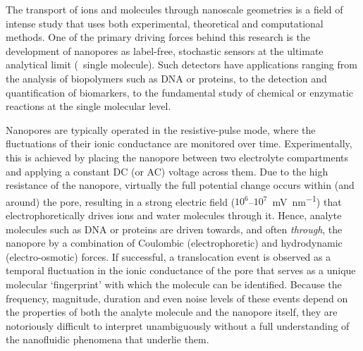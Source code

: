 \documentclass[journal=ancac3,manuscript=article,etalmode=truncate,maxauthors=0,layout=onecolumn]{achemso}
\begin{document}
The transport of ions and molecules through nanoscale geometries is a field of intense study that uses both
experimental, theoretical and computational methods.\cite{Sparreboom-2010,Bocquet-2010,Maffeo-2012,
Thomas-2014,Wang-2014,Kim-2015} One of the primary driving forces behind this research is the development of
nanopores as label-free, stochastic sensors at the ultimate analytical limit (\ie{}~single molecule).
\cite{Bayley-2001,Dekker-2007,Venkatesan-2011,Zhang-2016} Such detectors have applications ranging from the
analysis of biopolymers such as
DNA\cite{Deamer-2016,Kasianowicz-1996,Meller-2000,Maglia-2008,Butler-2008,Stoddart-2009,Franceschini-2013,Jain-2018}
or proteins,\cite{Restrepo-Perez-2018,Talaga-2009,Rodriguez-Larrea-2013, Nivala-2013,Kennedy-2016} to the
detection and quantification of
biomarkers,\cite{Chen-2013,Soskine-2012,Niedzwiecki-2013,VanMeervelt-2014,Huang-2017,Liu-2018,Galenkamp-2018}
to the fundamental study of chemical or enzymatic reactions at the single molecular
level.\cite{Willems-VanMeervelt-2017,Lieberman-2010, Nivala-2013,Ho-2015,Laszlo-2017}

Nanopores are typically operated in the resistive-pulse mode, where the fluctuations of their ionic
conductance are monitored over time.\cite{Bayley-2001,Dekker-2007,Maglia-2010,Venkatesan-2011} Experimentally,
this is achieved by placing the nanopore between two electrolyte compartments and applying a constant DC (or
AC) voltage across them. Due to the high resistance of the nanopore, virtually the full potential change
occurs within (and around) the pore, resulting in a strong electric field ($10^6$--$10^7$~\si{\mV\per\nm})
that electrophoretically drives ions and water molecules through
it.\cite{Wong-2007,Mao-2014,Haywood-2014,Laohakunakorn-2015} Hence, analyte molecules such as DNA or proteins
are driven towards, and often \emph{through}, the nanopore by a combination of Coulombic (electrophoretic) and
hydrodynamic (electro-osmotic) forces.\cite{Wong-2007,Grosberg-2010,Muthukumar-2010, Muthukumar-2014} If
successful, a translocation event is observed as a temporal fluctuation in the ionic conductance of the pore
that serves as a unique molecular `fingerprint' with which the molecule can be identified.\cite{Yusko-2017}
Because the frequency, magnitude, duration and even noise levels of these events depend on the properties of
both the analyte molecule and the nanopore itself, they are notoriously difficult to interpret unambiguously
without a full understanding of the nanofluidic phenomena that underlie them.
\end{document}

